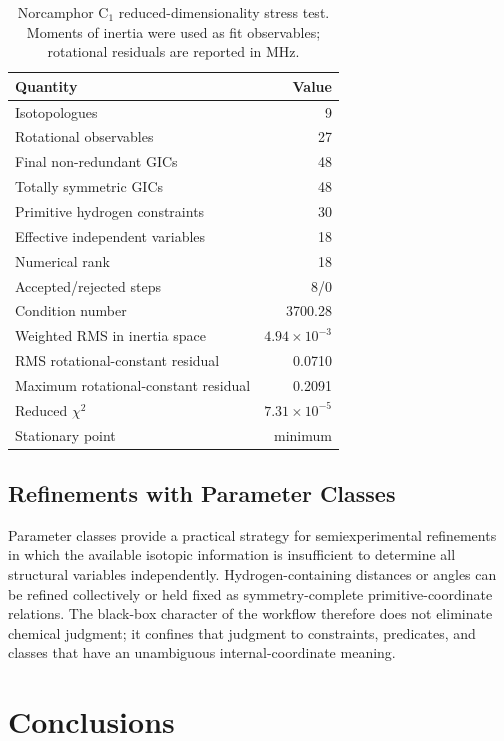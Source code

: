 \documentclass[journal=jctcce,manuscript=article,maxauthors=999]{achemso}
\begin{document}
\begin{table}
\caption{Norcamphor C$_1$ reduced-dimensionality stress test. Moments of inertia were used as fit observables; rotational residuals are reported in MHz.}
\label{tab:norcamphor-fit}
\begin{tabular}{lr}
\toprule
Quantity & Value \\
\midrule
Isotopologues & 9 \\
Rotational observables & 27 \\
Final non-redundant GICs & 48 \\
Totally symmetric GICs & 48 \\
Primitive hydrogen constraints & 30 \\
Effective independent variables & 18 \\
Numerical rank & 18 \\
Accepted/rejected steps & 8/0 \\
Condition number & 3700.28 \\
Weighted RMS in inertia space & $4.94\times10^{-3}$ \\
RMS rotational-constant residual & 0.0710 \\
Maximum rotational-constant residual & 0.2091 \\
Reduced $\chi^2$ & $7.31\times10^{-5}$ \\
Stationary point & minimum \\
\bottomrule
\end{tabular}
\end{table}


\subsection{Refinements with Parameter Classes}

Parameter classes provide a practical strategy for semiexperimental
refinements in which the available isotopic information is insufficient to
determine all structural variables independently. Hydrogen-containing
distances or angles can be refined collectively or held fixed as
symmetry-complete primitive-coordinate relations. The black-box character of
the workflow therefore does not eliminate chemical judgment; it confines that
judgment to constraints, predicates, and classes that have an unambiguous
internal-coordinate meaning.


\section{Conclusions}
\end{document}
